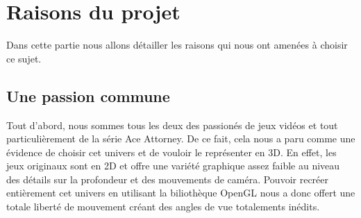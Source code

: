 \section{Raisons du projet}
	Dans cette partie nous allons détailler les raisons qui nous ont amenées à choisir ce sujet.\newline

\subsection{Une passion commune}

	Tout d'abord, nous sommes tous les deux des passionés de jeux vidéos et tout particulièrement de la série Ace Attorney. De ce fait, cela nous a paru comme une évidence de choisir cet univers et de vouloir le représenter en 3D. En effet, les jeux originaux sont en 2D et offre une variété graphique assez faible au niveau des détails sur la profondeur et des mouvements de caméra. Pouvoir recréer entièrement cet univers en utilisant la biliothèque OpenGL nous a donc offert une totale liberté de mouvement créant des angles de vue totalements inédits.